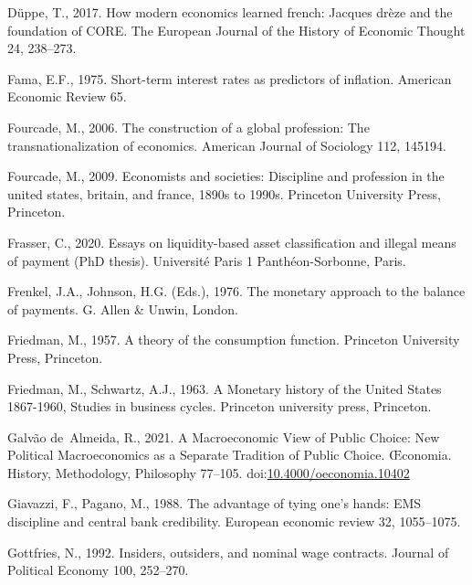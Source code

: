 \documentclass[
]{article}
\newlength{\cslhangindent}
\newlength{\cslentryspacingunit} %
\newenvironment{CSLReferences}[2] %
 {%
  \setlength{\parindent}{0pt}
  \ifodd #1
  \let\oldpar\par
  \def\par{\hangindent=\cslhangindent\oldpar}
  \fi
  \setlength{\parskip}{#2\cslentryspacingunit}
 }%
 {}
\begin{document}
\begin{CSLReferences}{1}{0}
\leavevmode{}%
Düppe, T., 2017. How modern economics learned french: Jacques drèze and
the foundation of CORE. The European Journal of the History of Economic
Thought 24, 238--273.

\leavevmode{}%
Fama, E.F., 1975. Short-term interest rates as predictors of inflation.
American Economic Review 65.

\leavevmode{}%
Fourcade, M., 2006. The construction of a global profession: The
transnationalization of economics. American Journal of Sociology 112,
145194.

\leavevmode{}%
Fourcade, M., 2009. Economists and societies: Discipline and profession
in the united states, britain, and france, 1890s to 1990s. Princeton
University Press, Princeton.

\leavevmode{}%
Frasser, C., 2020. Essays on liquidity-based asset classiﬁcation and
illegal means of payment (PhD thesis). Université Paris 1
Panthéon-Sorbonne, Paris.

\leavevmode{}%
Frenkel, J.A., Johnson, H.G. (Eds.), 1976. The monetary approach to the
balance of payments. {G. Allen \& Unwin}, {London}.

\leavevmode{}%
Friedman, M., 1957. A theory of the consumption function. Princeton
University Press, Princeton.

\leavevmode{}%
Friedman, M., Schwartz, A.J., 1963. A {Monetary} history of the {United}
{States} 1867-1960, Studies in business cycles. Princeton university
press, Princeton.

\leavevmode{}%
Galvão de~Almeida, R., 2021. A {Macroeconomic View} of {Public Choice}:
{New Political Macroeconomics} as a {Separate Tradition} of {Public
Choice}. Œconomia. History, Methodology, Philosophy 77--105.
doi:\href{https://doi.org/10.4000/oeconomia.10402}{10.4000/oeconomia.10402}

\leavevmode{}%
Giavazzi, F., Pagano, M., 1988. The advantage of tying one's hands:
{EMS} discipline and central bank credibility. European economic review
32, 1055--1075.

\leavevmode{}%
Gottfries, N., 1992. Insiders, outsiders, and nominal wage contracts.
Journal of Political Economy 100, 252--270.


\end{CSLReferences}
\end{document}
